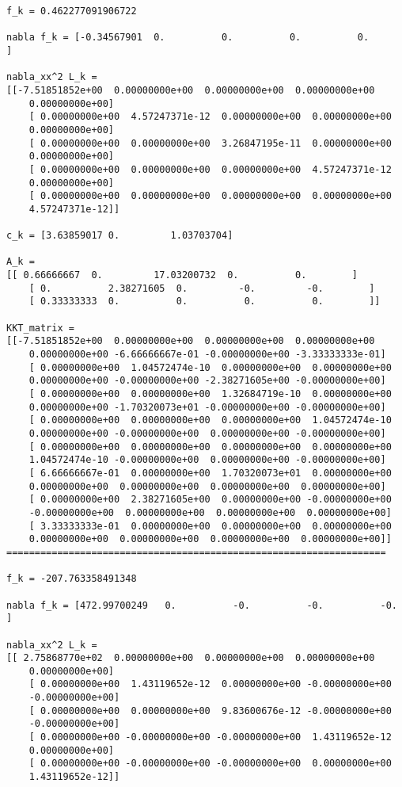 \documentclass{article}
\begin{document}
\begin{verbatim}
f_k = 0.462277091906722

nabla f_k = [-0.34567901  0.          0.          0.          0.        ]

nabla_xx^2 L_k = 
[[-7.51851852e+00  0.00000000e+00  0.00000000e+00  0.00000000e+00
    0.00000000e+00]
    [ 0.00000000e+00  4.57247371e-12  0.00000000e+00  0.00000000e+00
    0.00000000e+00]
    [ 0.00000000e+00  0.00000000e+00  3.26847195e-11  0.00000000e+00
    0.00000000e+00]
    [ 0.00000000e+00  0.00000000e+00  0.00000000e+00  4.57247371e-12
    0.00000000e+00]
    [ 0.00000000e+00  0.00000000e+00  0.00000000e+00  0.00000000e+00
    4.57247371e-12]]

c_k = [3.63859017 0.         1.03703704]

A_k = 
[[ 0.66666667  0.         17.03200732  0.          0.        ]
    [ 0.          2.38271605  0.         -0.         -0.        ]
    [ 0.33333333  0.          0.          0.          0.        ]]

KKT_matrix = 
[[-7.51851852e+00  0.00000000e+00  0.00000000e+00  0.00000000e+00
    0.00000000e+00 -6.66666667e-01 -0.00000000e+00 -3.33333333e-01]
    [ 0.00000000e+00  1.04572474e-10  0.00000000e+00  0.00000000e+00
    0.00000000e+00 -0.00000000e+00 -2.38271605e+00 -0.00000000e+00]
    [ 0.00000000e+00  0.00000000e+00  1.32684719e-10  0.00000000e+00
    0.00000000e+00 -1.70320073e+01 -0.00000000e+00 -0.00000000e+00]
    [ 0.00000000e+00  0.00000000e+00  0.00000000e+00  1.04572474e-10
    0.00000000e+00 -0.00000000e+00  0.00000000e+00 -0.00000000e+00]
    [ 0.00000000e+00  0.00000000e+00  0.00000000e+00  0.00000000e+00
    1.04572474e-10 -0.00000000e+00  0.00000000e+00 -0.00000000e+00]
    [ 6.66666667e-01  0.00000000e+00  1.70320073e+01  0.00000000e+00
    0.00000000e+00  0.00000000e+00  0.00000000e+00  0.00000000e+00]
    [ 0.00000000e+00  2.38271605e+00  0.00000000e+00 -0.00000000e+00
    -0.00000000e+00  0.00000000e+00  0.00000000e+00  0.00000000e+00]
    [ 3.33333333e-01  0.00000000e+00  0.00000000e+00  0.00000000e+00
    0.00000000e+00  0.00000000e+00  0.00000000e+00  0.00000000e+00]]
===================================================================

f_k = -207.763358491348

nabla f_k = [472.99700249   0.          -0.          -0.          -0.        ]

nabla_xx^2 L_k = 
[[ 2.75868770e+02  0.00000000e+00  0.00000000e+00  0.00000000e+00
    0.00000000e+00]
    [ 0.00000000e+00  1.43119652e-12  0.00000000e+00 -0.00000000e+00
    -0.00000000e+00]
    [ 0.00000000e+00  0.00000000e+00  9.83600676e-12 -0.00000000e+00
    -0.00000000e+00]
    [ 0.00000000e+00 -0.00000000e+00 -0.00000000e+00  1.43119652e-12
    0.00000000e+00]
    [ 0.00000000e+00 -0.00000000e+00 -0.00000000e+00  0.00000000e+00
    1.43119652e-12]]


\end{verbatim}
\end{document}
